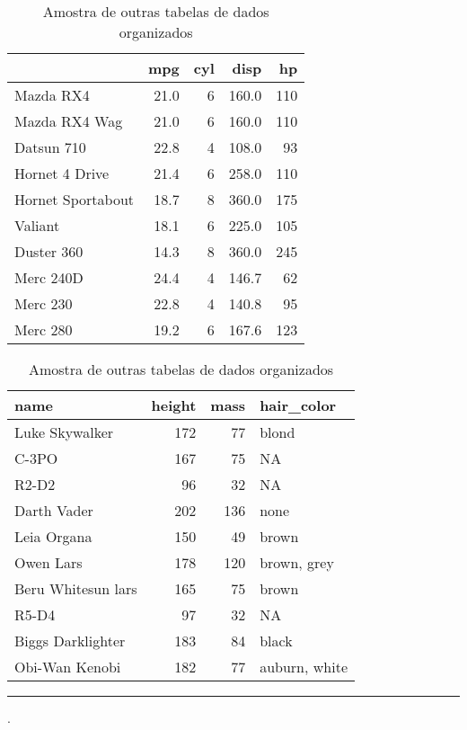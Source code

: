 \documentclass[12pt,]{style/krantz}
\makeatletter
\newenvironment{Shaded}{\begin{snugshade}}{\end{snugshade}}
\newcommand{\NormalTok}[1]{#1}
\newenvironment{kframe}{%
\medskip{}
\setlength{\fboxsep}{.8em}
 \def\at@end@of@kframe{}%
 \ifinner\ifhmode%
  \def\at@end@of@kframe{\end{minipage}}%
  \begin{minipage}{\columnwidth}%
 \fi\fi%
 \def\FrameCommand##1{\hskip\@totalleftmargin \hskip-\fboxsep
 \colorbox{shadecolor}{##1}\hskip-\fboxsep
     \hskip-\linewidth \hskip-\@totalleftmargin \hskip\columnwidth}%
 \MakeFramed {\advance\hsize-\width
   \@totalleftmargin\z@ \linewidth\hsize
   \@setminipage}}%
 {\par\unskip\endMakeFramed%
 \at@end@of@kframe}
\renewenvironment{Shaded}{\begin{kframe}}{\end{kframe}}
\theoremstyle{definition}
\theoremstyle{definition}
\theoremstyle{definition}
\theoremstyle{remark}
\makeatother
\begin{document}
\begin{table}[!h]
\caption{\label{tab:tab02}Amostra de outras tabelas de dados organizados}

\centering
\begin{tabular}{lrrrr}
\toprule
  & mpg & cyl & disp & hp\\
\midrule
Mazda RX4 & 21.0 & 6 & 160.0 & 110\\
Mazda RX4 Wag & 21.0 & 6 & 160.0 & 110\\
Datsun 710 & 22.8 & 4 & 108.0 & 93\\
Hornet 4 Drive & 21.4 & 6 & 258.0 & 110\\
Hornet Sportabout & 18.7 & 8 & 360.0 & 175\\
\addlinespace
Valiant & 18.1 & 6 & 225.0 & 105\\
Duster 360 & 14.3 & 8 & 360.0 & 245\\
Merc 240D & 24.4 & 4 & 146.7 & 62\\
Merc 230 & 22.8 & 4 & 140.8 & 95\\
Merc 280 & 19.2 & 6 & 167.6 & 123\\
\bottomrule
\end{tabular}
\centering
\begin{tabular}{lrrl}
\toprule
name & height & mass & hair\_color\\
\midrule
Luke Skywalker & 172 & 77 & blond\\
C-3PO & 167 & 75 & NA\\
R2-D2 & 96 & 32 & NA\\
Darth Vader & 202 & 136 & none\\
Leia Organa & 150 & 49 & brown\\
\addlinespace
Owen Lars & 178 & 120 & brown, grey\\
Beru Whitesun lars & 165 & 75 & brown\\
R5-D4 & 97 & 32 & NA\\
Biggs Darklighter & 183 & 84 & black\\
Obi-Wan Kenobi & 182 & 77 & auburn, white\\
\bottomrule
\end{tabular}
\end{table}

\pagebreak

\begin{center}\rule{0.5\linewidth}{\linethickness}\end{center}

\begin{Shaded}
\begin{Highlighting}[]
\NormalTok{.}
\end{Highlighting}
\end{Shaded}
\end{document}
